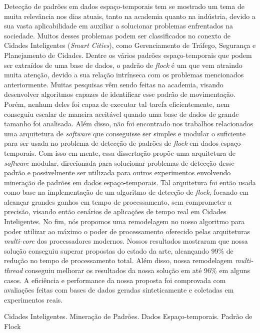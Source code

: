 Detecção de padrões em dados espaço-temporais tem se mostrado um tema de muita relevância nos dias atuais, tanto na
academia quanto na indústria, devido a sua vasta aplicabilidade em auxiliar a solucionar problemas enfrentados na
sociedade. Muitos desses problemas podem ser classificados no conexto de Cidades Inteligentes (\textit{Smart Cities}),
como Gerenciamento de Tráfego, Segurança e Planejamento de Cidades. Dentre os vários padrões espaço-temporais que podem
ser extraídos de uma base de dados, o padrão de \textit{flock} é um que vem atraindo muita atenção, devido a sua relação
intrínseca com os problemas mencionados anteriormente. Muitas pesquisas vêm sendo feitas na academia, visando
desenvolver algoritmos capazes de identificar esse padrão de movimentação. Porém, nenhum deles foi capaz de executar tal
tarefa eficientemente, nem conseguiu escalar de maneira aceitável quando uma base de dados de grande tamanho foi
analisada. Além disso, não foi encontrado nos trabalhos relacionados uma arquitetura de \textit{software} que
conseguisse ser simples e modular o suficiente para ser usada no problema de detecção de padrões de \textit{flock} em
dados espaço-temporais. Com isso em mente, essa dissertação propõe uma arquitetura de \textit{software} modular,
direcionada para solucionar problemas de detecção desse padrão e possivelmente ser utilizada para outros experimentos
envolvendo mineração de padrões em dados espaço-temporais. Tal arquitetura foi então usada como base na implementação de
um algoritmo de detecção de \textit{flock}, focando em alcançar grandes ganhos em tempo de processamento, sem
comprometer a precisão, visando então cenários de aplicações de tempo real em Cidades Inteligentes.  No fim, nós
propomos uma remodelagem no nosso algoritmo para poder utilizar ao máximo o poder de processamento oferecido pelas
arquiteturas \textit{multi-core} dos processadores modernos. Nossos resultados mostraram que nossa solução conseguiu
superar propostas do estado da arte, alcançando 99\% de redução no tempo de processamento total. Além disso, nossa
remodelagem \textit{multi-thread} conseguiu melhorar os resultados da nossa solução em até 96\% em alguns casos. A
eficiência e performance da nossa proposta foi comprovada com avaliações feitas com bases de dados geradas
sinteticamente e coletadas em experimentos reais.

\begin{keywords}
Cidades Inteligentes. Mineração de Padrões. Dados Espaço-temporais. Padrão de Flock
\end{keywords}
